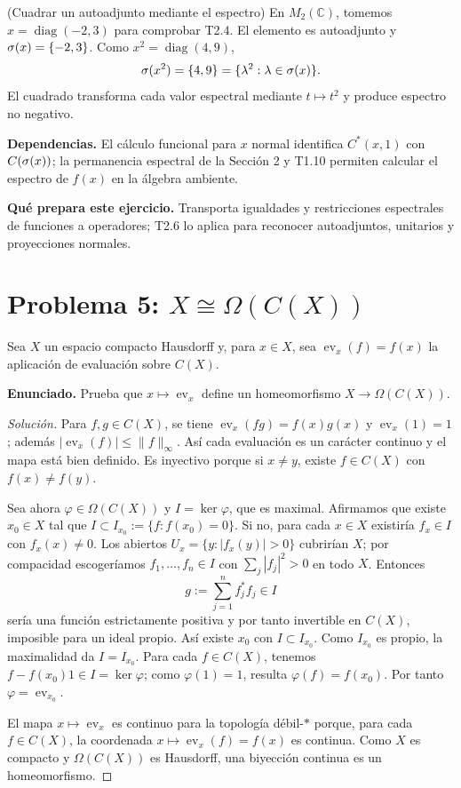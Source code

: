 \begin{cthejemplo}{(Cuadrar un autoadjunto mediante el espectro)}
En $M_2(\mathbb C)$, tomemos $x=\operatorname{diag}(-2,3)$ para comprobar T2.4.
El elemento es autoadjunto y $\sigma(x)=\{-2,3\}$.
Como $x^2=\operatorname{diag}(4,9)$,
\[
 \sigma(x^2)=\{4,9\}=\{\lambda^2:\lambda\in\sigma(x)\}.
\]
El cuadrado transforma cada valor espectral mediante $t\mapsto t^2$ y produce espectro no negativo.
\end{cthejemplo}

\noindent\textbf{Dependencias.} El cálculo funcional para $x$ normal identifica $C^*(x,1)$ con $C(\sigma(x))$; la permanencia espectral de la Sección 2 y T1.10 permiten calcular el espectro de $f(x)$ en la álgebra ambiente.

\noindent\textbf{Qué prepara este ejercicio.} Transporta igualdades y restricciones espectrales de funciones a operadores; T2.6 lo aplica para reconocer autoadjuntos, unitarios y proyecciones normales.

\section{Problema 5: $X\cong\Omega(C(X))$}

Sea $X$ un espacio compacto Hausdorff y, para $x\in X$, sea
$\operatorname{ev}_x(f)=f(x)$ la aplicación de evaluación sobre $C(X)$.

\noindent\textbf{Enunciado.} Prueba que $x\mapsto\operatorname{ev}_x$ define un homeomorfismo $X\to\Omega(C(X))$.

\begin{proof}[Solución]
Para $f,g\in C(X)$, se tiene
$\operatorname{ev}_x(fg)=f(x)g(x)$ y $\operatorname{ev}_x(1)=1$;
además $|\operatorname{ev}_x(f)|\le\|f\|_\infty$. Así cada evaluación es un carácter continuo
y el mapa está bien definido. Es inyectivo porque
si $x\neq y$, existe $f\in C(X)$ con $f(x)\neq f(y)$.

Sea ahora $\varphi\in\Omega(C(X))$ y $I=\ker\varphi$, que es maximal. Afirmamos que existe
$x_0\in X$ tal que $I\subset I_{x_0}:=\{f:f(x_0)=0\}$. Si no, para cada $x\in X$ existiría
$f_x\in I$ con $f_x(x)\neq0$. Los abiertos
$U_x=\{y:|f_x(y)|>0\}$ cubrirían $X$; por compacidad escogeríamos
$f_1,\dots,f_n\in I$ con $\sum_j|f_j|^2>0$ en todo $X$. Entonces
\[
 g:=\sum_{j=1}^n f_j^*f_j\in I
\]
sería una función estrictamente positiva y por tanto invertible en $C(X)$, imposible para un ideal
propio. Así existe $x_0$ con $I\subset I_{x_0}$. Como $I_{x_0}$ es propio, la maximalidad da
$I=I_{x_0}$. Para cada $f\in C(X)$, tenemos $f-f(x_0)1\in I=\ker\varphi$; como
$\varphi(1)=1$, resulta $\varphi(f)=f(x_0)$. Por tanto
$\varphi=\operatorname{ev}_{x_0}$.

El mapa $x\mapsto\operatorname{ev}_x$ es continuo para la topología débil-$*$ porque, para cada
$f\in C(X)$, la coordenada $x\mapsto\operatorname{ev}_x(f)=f(x)$ es continua. Como $X$ es compacto
y $\Omega(C(X))$ es Hausdorff, una biyección continua es un homeomorfismo.
\end{proof}

